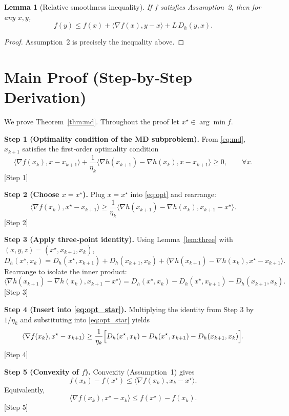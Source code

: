 \documentclass{article}
\newtheorem{lemma}{Lemma}
\newcommand{\Breg}{D_{h}}
\newcommand{\inner}[2]{\langle #1,#2\rangle}
\begin{document}
\begin{lemma}[Relative smoothness inequality]\label{lem:smooth}
If $f$ satisfies Assumption~2, then for any $x,y$,
\[
f(y)\le f(x)+\inner{\nabla f(x)}{y-x}+L\,\Breg(y,x).
\]
\end{lemma}
\begin{proof}
Assumption~2 is precisely the inequality above. \hfill\qedsymbol
\end{proof}

\section*{Main Proof (Step‑by‑Step Derivation)}
We prove Theorem~\ref{thm:md}. Throughout the proof let $x^{\star}\in\arg\min f$.

\noindent\textbf{Step 1 (Optimality condition of the MD subproblem).}
From \eqref{eq:md}, $x_{k+1}$ satisfies the first‑order optimality condition
\begin{equation}
\label{eq:opt}
\inner{\nabla f(x_k)}{x-x_{k+1}}+\frac{1}{\eta_k}\inner{\nabla h(x_{k+1})-\nabla h(x_k)}{x-x_{k+1}}\ge0,
\qquad\forall x.
\end{equation}
[Step 1]

\noindent\textbf{Step 2 (Choose $x=x^{\star}$).}
Plug $x=x^{\star}$ into \eqref{eq:opt} and rearrange:
\begin{equation}
\label{eq:opt_star}
\inner{\nabla f(x_k)}{x^{\star}-x_{k+1}}
\ge
\frac{1}{\eta_k}\inner{\nabla h(x_{k+1})-\nabla h(x_k)}{x_{k+1}-x^{\star}}.
\end{equation}
[Step 2]

\noindent\textbf{Step 3 (Apply three‑point identity).}
Using Lemma~\ref{lem:three} with $(x,y,z)=(x^{\star},x_{k+1},x_k)$,
\[
\Breg(x^{\star},x_k)=\Breg(x^{\star},x_{k+1})+\Breg(x_{k+1},x_k)
+\inner{\nabla h(x_{k+1})-\nabla h(x_k)}{x^{\star}-x_{k+1}}.
\]
Rearrange to isolate the inner product:
\[
\inner{\nabla h(x_{k+1})-\nabla h(x_k)}{x_{k+1}-x^{\star}}
= \Breg(x^{\star},x_k)-\Breg(x^{\star},x_{k+1})-\Breg(x_{k+1},x_k).
\]
[Step 3]

\noindent\textbf{Step 4 (Insert into \eqref{eq:opt_star}).}
Multiplying the identity from Step 3 by $1/\eta_k$ and substituting into \eqref{eq:opt_star} yields
\[
\inner{\nabla f(x_k)}{x^{\star}-x_{k+1}}
\ge
\frac{1}{\eta_k}\Bigl[\Breg(x^{\star},x_k)-\Breg(x^{\star},x_{k+1})-\Breg(x_{k+1},x_k)\Bigr].
\]
[Step 4]

\noindent\textbf{Step 5 (Convexity of $f$).}
Convexity (Assumption~1) gives
\[
f(x_k)-f(x^{\star})\le \inner{\nabla f(x_k)}{x_k-x^{\star}}.
\]
Equivalently,
\[
\inner{\nabla f(x_k)}{x^{\star}-x_{k}} \le f(x^{\star})-f(x_k).
\]
[Step 5]
\end{document}
